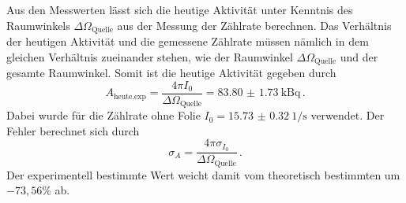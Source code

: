 Aus den Messwerten lässt sich die heutige Aktivität unter
Kenntnis des Raumwinkels $\Delta \Omega_{\text{Quelle}}$ aus der Messung der Zählrate berechnen.
Das Verhältnis der heutigen Aktivität und die gemessene Zählrate müssen nämlich in
dem gleichen Verhältnis zueinander stehen, wie der Raumwinkel $\Delta \Omega_{\text{Quelle}}$ und
der gesamte Raumwinkel. Somit ist die heutige Aktivität gegeben durch
\begin{equation*}
  A_{\text{heute,exp}}=\frac{4 \pi  I_0}{\Delta \Omega_{\text{Quelle}}}=\SI{83.80(173)}{\kilo\becquerel} \,.
\end{equation*}
Dabei wurde für die Zählrate ohne Folie $I_0=\SI{15.73(032)}{1 \per\second}$ verwendet.
Der Fehler berechnet sich durch
\begin{equation*}
  \sigma_A=\frac{4 \pi  \sigma_{I_0}}{\Delta \Omega_{\text{Quelle}}} \,.
\end{equation*}
Der experimentell bestimmte Wert weicht damit vom theoretisch bestimmten um
$-73{,}56\%$ ab.

